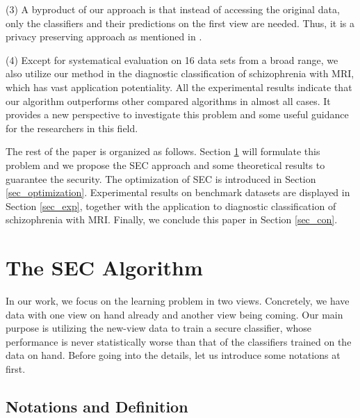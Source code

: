 \documentclass[10pt,journal,compsoc]{IEEEtran}
\begin{document}
(3) A byproduct of our approach is that instead of accessing the original data, only the classifiers and their predictions on the first view are needed. Thus, it is a privacy preserving approach as mentioned in \cite{cikm/YeZMJZ15}.

(4) Except for systematical evaluation on 16 data sets from a broad range, we also utilize our method in the diagnostic classification of schizophrenia with MRI, which has vast application potentiality. All the experimental results indicate that our algorithm outperforms other compared algorithms in almost all cases. It provides a new perspective to investigate this problem and some useful guidance for the researchers in this field.

The rest of the paper is organized as follows. Section \ref{sec_TTFC} will formulate this problem and we propose the SEC approach and some theoretical results to guarantee the security. The optimization of SEC is introduced in Section \ref{sec_optimization}. Experimental results on benchmark datasets are displayed in Section \ref{sec_exp}, together with the application to diagnostic classification of schizophrenia with MRI. Finally, we conclude this paper in Section \ref{sec_con}.

\section{The SEC Algorithm}
\label{sec_TTFC}

In our work, we focus on the learning problem in two views. Concretely, we have data with one view on hand already and another view being coming. Our main purpose is utilizing the new-view data to train a secure classifier, whose performance is never statistically worse than that of the classifiers trained on the data on hand. Before going into the details, let us introduce some notations at first.

\subsection{Notations and Definition}
\end{document}
